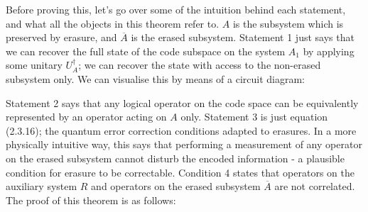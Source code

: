 \documentclass[12pt,a4paper]{report}
\numberwithin{equation}{section}
\newcommand{\ol}[1]{\overline{#1}}
\theoremstyle{definition}
\theoremstyle{theorem}
\theoremstyle{theorem}
\theoremstyle{example}
\theoremstyle{definition}
\begin{document}
Before proving this, let's go over some of the intuition behind each statement, and what all the objects in this theorem refer to. $A$ is the subsystem which is preserved by erasure, and $\ol{A}$ is the erased subsystem. Statement 1 just says that we can recover the full state of the code subspace on the system $A_{1}$ by applying some unitary $U_{A}^{\dagger}$; we can recover the state with access to the non-erased subsystem only. We can visualise this by means of a circuit diagram:
\begin{figure}[H] 
	\centering
\end{figure}
Statement 2 says that any logical operator on the code space can be equivalently represented by an operator acting on $A$ only. Statement 3 is just equation (2.3.16); the quantum error correction conditions adapted to erasures. In a more physically intuitive way, this says that performing a measurement of any operator on the erased subsystem cannot disturb the encoded information - a plausible condition for erasure to be correctable. Condition 4 states that operators on the auxiliary system $R$ and operators on the erased subsystem $\ol{A}$ are not correlated. The proof of this theorem is as follows:
\newcommand{\Xabar}{X_{\overline{A}}}
\end{document}
